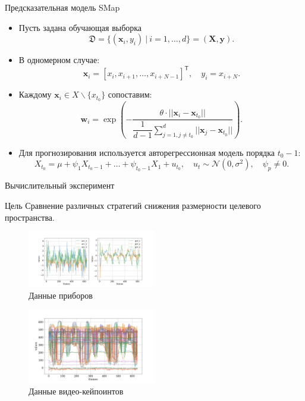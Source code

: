 \documentclass{beamer}
\newcommand{\bx}{\mathbf{x}}
\newcommand{\by}{\mathbf{y}}
\newcommand{\bw}{\mathbf{w}}
\newcommand{\bX}{\mathbf{X}}
\newcommand{\T}{^{\mathsf{T}}}
\begin{document}
	\begin{frame}{Предсказательная модель SMap}
		\begin{itemize}
			\item[\textbullet] Пусть задана обучающая выборка
			\[ \mathfrak{D} = \{ (\bx_i, y_i) \: | \: i = 1, \ldots, d \} = (\bX, \by).\]
			
			\item[\textbullet] В одномерном случае:
			\[ \bx_i = [x_i, x_{i+1}, \ldots, x_{i+N-1}]\T, \quad y_i = x_{i+N}. \]
			
			\item[\textbullet] Каждому $\bx_i \in X \backslash \{ x_{t_0}\}$ сопоставим: \[ \bw_i = \exp \left(-\dfrac{\theta \cdot ||\bx_i - \bx_{t_0}||}{\dfrac{1}{d-1} \sum\limits_{j=1, j \neq t_0}^d ||\bx_j - \bx_{t_0}||} \right). \]
			
			\item[\textbullet] Для прогнозирования используется авторегрессионная модель порядка $t_0-1$:
			\[ X_{t_0} = \mu + \psi_1 X_{t_0-1} + \ldots + \psi_{t_0-1} X_1 + u_{t_0}, \quad u_t \sim \mathcal{N}(0, \sigma^2), \quad \psi_p \neq 0.\]
		\end{itemize}
	\end{frame}

	\begin{frame}{Вычислительный эксперимент}
		\begin{alertblock}{Цель}
			Сравнение различных стратегий снижения размерности целевого пространства.
		\end{alertblock}
		
		
		\begin{multicols}{2}
		\begin{figure}
			\includegraphics[width=0.5\textwidth]{cyclic_devices_data.png}
			\caption{Данные приборов}
		\end{figure}
	
		\begin{figure}[bhtp]
			\includegraphics[width=0.5\textwidth]{cyclic_video_data.png}
			\caption{Данные видео-кейпоинтов}
		\end{figure}
		\end{multicols}
		
	\end{frame}
\end{document}
